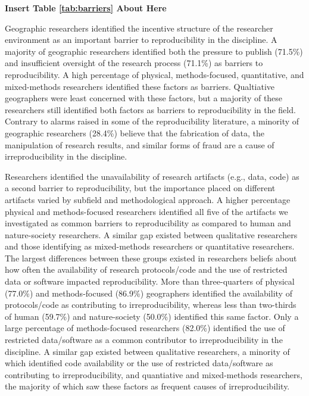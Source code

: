 \documentclass[]{interact}
\theoremstyle{plain}%
\theoremstyle{definition}
\theoremstyle{remark}
\begin{document}
\begin{center}
\textbf{Insert Table \ref{tab:barriers} About Here}
\end{center}

Geographic researchers identified the incentive structure of the researcher environment as an important barrier to reproducibility in the discipline.
A majority of geographic researchers identified both the pressure to publish (71.5\%) and insufficient oversight of the research process (71.1\%) as barriers to reproducibility.
A high percentage of physical, methods-focused, quantitative, and mixed-methods researchers identified these factors as barriers. 
Qualtiative geographers were least concerned with these factors, but a majority of these researchers still identified both factors as barriers to reproducibility in the field.
Contrary to alarms raised in some of the reproducibility literature, a minority of geographic researchers (28.4\%) believe that the fabrication of data, the manipulation of research results, and similar forms of fraud are a cause of irreproducibility in the discipline.

Researchers identified the unavailability of research artifacts (e.g., data, code) as a second barrier to reproducibility, but the importance placed on different artifacts varied by subfield and methodological approach.
A higher percentage physical and methods-focused researchers identified all five of the artifacts we investigated as common barriers to reproducibility as compared to human and nature-society researchers.
A similar gap existed between qualitative researchers and those identifying as mixed-methods researchers or quantitative researchers. 
The largest differences between these groups existed in researchers beliefs about how often the availability of research protocols/code and the use of restricted data or software impacted reproducibility.
More than three-quarters of physical (77.0\%) and methods-focused (86.9\%) geographers identified the availability of protocols/code as contributing to irreproducibility, whereas less than two-thirds of human (59.7\%) and nature-society (50.0\%) identified this same factor. 
Only a large percentage of methods-focused researchers (82.0\%) identified the use of restricted data/software as a common contributor to irreproducibility in the discipline.
A similar gap existed between qualitative researchers, a minority of which identified code availability or the use of restricted data/software as contributing to irreproducibility, and quantiative and mixed-methods researchers, the majority of which saw these factors as frequent causes of irreproducibility.  
\end{document}
